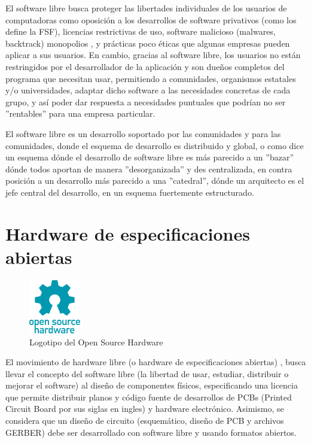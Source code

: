 El software libre busca proteger las libertades individuales de los usuarios de computadoras como oposición a los desarrollos de software privativos (como los define la FSF), licencias restrictivas de uso, software malicioso (malwares, backtrack) monopolios \citep{beatriz_busaniche_argentina_2010}, y prácticas poco éticas que algunas empresas pueden aplicar a sus usuarios. En cambio, gracias al software libre, los usuarios no están restringidos por el desarrollador de la aplicación y son dueños completos del programa que necesitan usar, permitiendo a comunidades, organismos estatales y/o universidades, adaptar dicho software a las necesidades concretas de cada grupo, y así poder dar respuesta a necesidades puntuales que podrían no ser ''rentables'' para una empresa particular.

El software libre es un desarrollo soportado por las comunidades y para las comunidades, donde el esquema de desarrollo es distribuido y global, o como dice \citep{raymond_catedral_1998} un esquema dónde el desarrollo de software libre es más parecido a un ''bazar'' dónde todos aportan de manera ''desorganizada'' y des centralizada, en contra posición a un desarrollo más parecido a una ''catedral'', dónde un arquitecto es el jefe central del desarrollo, en un esquema fuertemente estructurado.

\section{Hardware de especificaciones abiertas }

\begin{figure}[htb]
  \begin{center}
    \includegraphics[width=0.2\textwidth]{figuras/Open-source-hardware-logo.png}
    \caption{Logotipo del Open Source Hardware}
    \label{fig: }
  \end{center}
\end{figure}

El movimiento de hardware libre (o hardware de especificaciones abiertas) , busca llevar el concepto del software libre (la libertad de usar, estudiar, distribuir o mejorar el software) al diseño de  componentes físicos, especificando una licencia que permite distribuir planos y código fuente de desarrollos de PCBs (Printed Circuit Board por sus siglas en ingles) y hardware electrónico. Asimismo, se considera que un diseño de circuito (esquemático, diseño de PCB y archivos GERBER) debe ser desarrollado con software libre y usando formatos abiertos.

